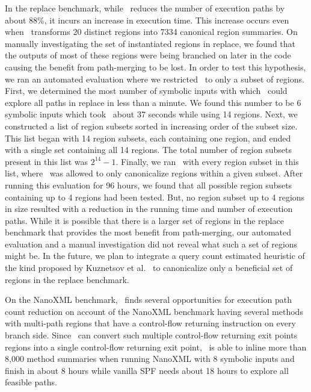 In the replace benchmark, while \tool\ reduces the number of execution paths by about 88\%, it incurs an increase in
execution time.
%
This increase occurs even when \tool\ transforms 20 distinct regions into 7334 canonical region summaries.
%
On manually investigating the set of instantiated regions in replace, we found that the outputs of most of these
regions were being branched on later in the code causing the benefit from path-merging to be lost.
%
In order to test this hypothesis, we ran an automated evaluation where we restricted \tool\ to only a subset of
regions.
%
First, we determined the most number of symbolic inputs with which \tool\ could explore all paths in replace in less
than a minute.
%
We found this number to be 6 symbolic inputs which took \tool\ about 37 seconds while using 14 regions.
%
Next, we constructed a list of region subsets sorted in increasing order of the subset size.
%
This list began with 14 region subsets, each containing one region, and ended with a single set containing all 14 regions.
%
The total number of region subsets present in this list was $2^{14}-1$.
%
Finally, we ran \tool\ with every region subset in this list, where \tool\ was allowed to only canonicalize regions
within a given subset.
%
After running this evaluation for 96 hours, we found that all possible region subsets containing up to 4 regions had
been tested.
%
But, no region subset up to 4 regions in size resulted with a reduction in the running time and number of execution
paths.
%
While it is possible that there is a larger set of regions in the replace benchmark that provides the most benefit
from path-merging, our automated evaluation and a manual investigation did not reveal what such a set of regions might be.
%
In the future, we plan to integrate a query count estimated heuristic of the kind proposed by
Kuznetsov et al.~\cite{kuznetsov} to canonicalize only a beneficial set of regions in the replace benchmark.

On the NanoXML benchmark, \tool\ finds several opportunities for execution path count reduction on account of the
NanoXML benchmark having several methods with multi-path regions that have a control-flow returning instruction on every
branch side.
%
Since \tool\ can convert such multiple control-flow returning exit points regions into a single control-flow
returning exit point, \tool\ is able to inline more than 8,000 method summaries when running NanoXML with 8 symbolic
inputs and finish in about 8 hours while vanilla SPF needs about 18 hours to explore all feasible paths.

